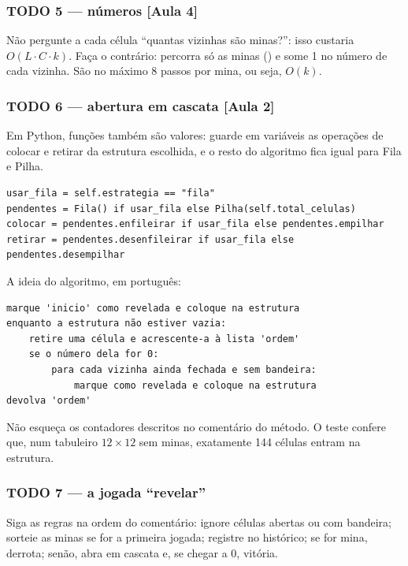 \documentclass[11pt]{article}
\begin{document}
\subsubsection{TODO 5 — números [Aula 4]}
Não pergunte a cada célula \enquote{quantas vizinhas são minas?}: isso custaria $O(L \cdot C \cdot k)$.
Faça o contrário: percorra só as minas () e some 1 no número de cada
vizinha. São no máximo 8 passos por mina, ou seja, $O(k)$.

\subsubsection{TODO 6 — abertura em cascata [Aula 2]}
Em Python, funções também são valores: guarde em variáveis as operações de colocar e retirar da
estrutura escolhida, e o resto do algoritmo fica igual para Fila e Pilha.

\begin{lstlisting}
usar_fila = self.estrategia == "fila"
pendentes = Fila() if usar_fila else Pilha(self.total_celulas)
colocar = pendentes.enfileirar if usar_fila else pendentes.empilhar
retirar = pendentes.desenfileirar if usar_fila else pendentes.desempilhar
\end{lstlisting}

A ideia do algoritmo, em português:

\begin{lstlisting}[style=terminal]
marque 'inicio' como revelada e coloque na estrutura
enquanto a estrutura não estiver vazia:
    retire uma célula e acrescente-a à lista 'ordem'
    se o número dela for 0:
        para cada vizinha ainda fechada e sem bandeira:
            marque como revelada e coloque na estrutura
devolva 'ordem'
\end{lstlisting}

Não esqueça os contadores descritos no comentário do método. O teste
 confere que, num tabuleiro $12 \times 12$ sem
minas, exatamente 144 células entram na estrutura.

\subsubsection{TODO 7 — a jogada \enquote{revelar}}
Siga as regras na ordem do comentário: ignore células abertas ou com bandeira; sorteie as minas
se for a primeira jogada; registre  no histórico; se for mina,
derrota; senão, abra em cascata e, se  chegar a 0, vitória.
\end{document}
